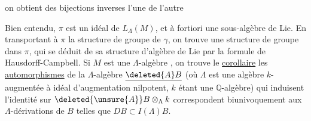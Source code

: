on obtient des bijections inverses l'une de l'autre

Bien entendu, $\pi$ est un idéal  de $L_\Lambda(M)$, et
à fortiori une sous-algèbre de Lie. En
transportant à $\pi$ la structure de groupe de
$\gamma$, on trouve une structure de groupe dans
$\pi$, qui se déduit de sa structure
d'algèbre de Lie par la formule de
Hausdorff-Campbell. Si $M$ est une
$\Lambda$-algèbre , on trouve le
\uline{corollaire} les \uline{automorphismes} de la
$\Lambda$-algèbre $\underline{\deleted{A}B}$ (où $\Lambda$ est une algèbre
$k$-augmentée à  idéal d'augmentation
nilpotent, $k$ étant une $\mathbb Q$-algèbre)
qui induisent l'identité sur $\deleted{\unsure{A}}B\otimes_\Lambda k$
correspondent biunivoquement aux
$\Lambda$-dérivations  de $B$ telles que $DB\subset I(\Lambda)B$.

